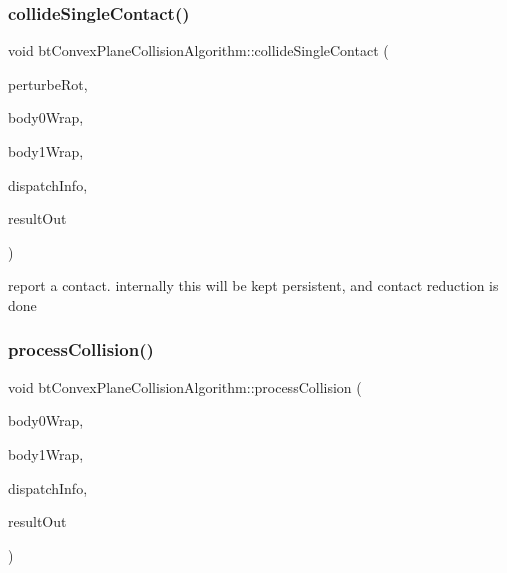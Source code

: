 \subsubsection{\texorpdfstring{collide\+Single\+Contact()}{collideSingleContact()}}
{\footnotesize\ttfamily void bt\+Convex\+Plane\+Collision\+Algorithm\+::collide\+Single\+Contact (\begin{DoxyParamCaption}\item[{const \hyperlink{classbtQuaternion}{bt\+Quaternion} \&}]{perturbe\+Rot,  }\item[{const \hyperlink{structbtCollisionObjectWrapper}{bt\+Collision\+Object\+Wrapper} $\ast$}]{body0\+Wrap,  }\item[{const \hyperlink{structbtCollisionObjectWrapper}{bt\+Collision\+Object\+Wrapper} $\ast$}]{body1\+Wrap,  }\item[{const \hyperlink{structbtDispatcherInfo}{bt\+Dispatcher\+Info} \&}]{dispatch\+Info,  }\item[{\hyperlink{classbtManifoldResult}{bt\+Manifold\+Result} $\ast$}]{result\+Out }\end{DoxyParamCaption})}

report a contact. internally this will be kept persistent, and contact reduction is done \mbox{\label{classbtConvexPlaneCollisionAlgorithm_ace95b966a346d00f7666549220f6afb8}} 
\subsubsection{\texorpdfstring{process\+Collision()}{processCollision()}}
{\footnotesize\ttfamily void bt\+Convex\+Plane\+Collision\+Algorithm\+::process\+Collision (\begin{DoxyParamCaption}\item[{const \hyperlink{structbtCollisionObjectWrapper}{bt\+Collision\+Object\+Wrapper} $\ast$}]{body0\+Wrap,  }\item[{const \hyperlink{structbtCollisionObjectWrapper}{bt\+Collision\+Object\+Wrapper} $\ast$}]{body1\+Wrap,  }\item[{const \hyperlink{structbtDispatcherInfo}{bt\+Dispatcher\+Info} \&}]{dispatch\+Info,  }\item[{\hyperlink{classbtManifoldResult}{bt\+Manifold\+Result} $\ast$}]{result\+Out }\end{DoxyParamCaption})\hspace{0.3cm}{\ttfamily [virtual]}}

